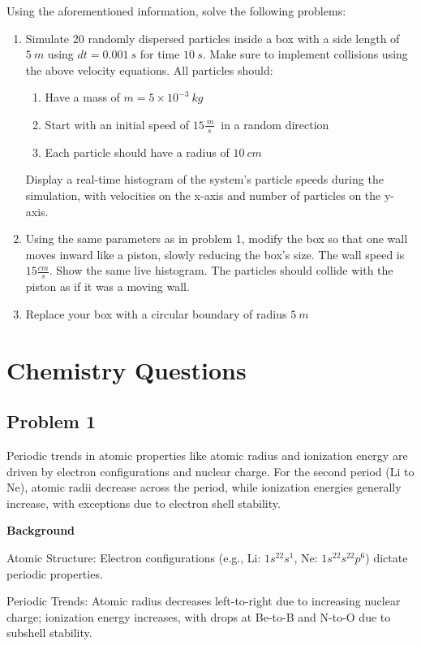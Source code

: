 \documentclass[12pt]{article}
\begin{document}
Using the aforementioned information, solve the following problems:
\begin{enumerate}
    \item 	Simulate 20 randomly dispersed particles inside a box with a side length of $5\ m$ using $dt=0.001\ s$ for time $10\ s$. Make sure to implement collisions using the above velocity equations. All particles should:
    \begin{enumerate}
        \item 	Have a mass of $m=5\times{10}^{-3}\ kg\ $
        \item 	Start with an initial speed of $ 15\frac{\ m}{s}\ $ in a random direction
        \item 	Each particle should have a radius of $10\ cm$
    \end{enumerate}
    Display a real-time histogram of the system’s particle speeds during the simulation, with velocities on the x-axis and number of particles on the y-axis.

    \item Using the same parameters as in problem 1, modify the box so that one wall moves inward like a piston, slowly reducing the box’s size. The wall speed is $15\frac{cm}{s}$. Show the same live histogram.  The particles should collide with the piston as if it was a moving wall.

    \item 	Replace your box with a circular boundary of radius $5\ m$
\end{enumerate}

    
\newpage
\section{Chemistry Questions}
\subsection{Problem 1}
        Periodic trends in atomic properties like atomic radius and ionization energy are driven by electron configurations and nuclear charge. For the second period (Li to Ne), atomic radii decrease across the period, while ionization energies generally increase, with exceptions due to electron shell stability.

\textbf{Background}

Atomic Structure: Electron configurations (e.g., Li: $1s^22s^1$, Ne: $1s^22s^22p^6$) dictate periodic properties.

Periodic Trends: Atomic radius decreases left-to-right due to increasing nuclear charge; ionization energy increases, with drops at Be-to-B and N-to-O due to subshell stability.
\end{document}
